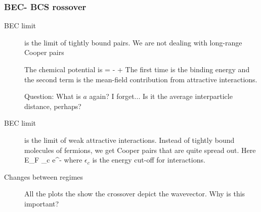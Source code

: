 \subsubsection{BEC- BCS rossover}
\begin{description}
\item[BEC limit] is the limit of tightly bound pairs. We are not dealing with long-range Cooper pairs 

The chemical potential is
\beq
\mu = -  + 
\eeq
The first time is the binding energy and the second term is the mean-field contribution from attractive interactions. 

Question: What is $a$ again? I forget... Is it the average interparticle distance, perhaps? 


\item[BEC limit] is the limit of weak attractive interactions. Instead of tightly bound molecules of fermions, we get Cooper pairs that are quite spread out. Here
\beq
\mu \simeq E_F
\eeq
\beq
\Delta {} \epsilon_c e^{- }
\eeq
where $\epsilon_c$ is the energy cut-off for interactions. 

\item[Changes between regimes] All the plots the show the crossover depict the wavevector. Why is this important? 




\end{description}
